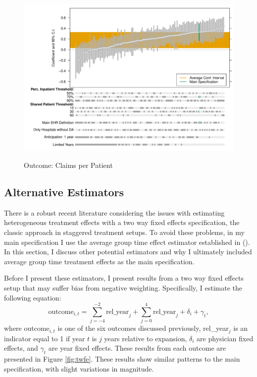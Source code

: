 \documentclass[12pt]{article}
\begin{document}
\begin{figure}[ht]
    \centering
    \caption{Outcome: Claims per Patient}
    \includegraphics[scale=.6]{Objects/claim_per_patient_chart.pdf}
    \label{fig:cpp_chart}
\end{figure}



\subsection{Alternative Estimators}\label{app:estimators}

There is a robust recent literature considering the issues with estimating heterogeneous treatment effects with a two way fixed effects specification, the classic approach in staggered treatment setups. To avoid these problems, in my main specification I use the average group time effect estimator established in \citeauthor{callaway2021difference} (\citeyear{callaway2021difference}). In this section, I discuss other potential estimators and why I ultimately included average group time treatment effects as the main specification. 

Before I present these estimators, I present results from a two way fixed effects setup that may suffer bias from negative weighting. Specifically, I estimate the following equation:
$$\text{outcome}_{i,t}=\sum_{j=-4}^{-2} \text{rel\_year}_{j} + \sum_{j=0}^{4} \text{rel\_year}_{j} + \delta_i + \gamma_t,$$
where outcome$_{i,t}$ is one of the six outcomes discussed previously, rel\_year$_j$ is an indicator equal to 1 if year $t$ is $j$ years relative to expansion, $\delta_i$ are physician fixed effects, and $\gamma_t$ are year fixed effects.
These results from each outcome are presented in Figure \ref{fig:twfe}. These results show similar patterns to the main specification, with slight variations in magnitude. 
\end{document}
